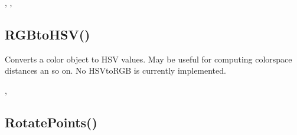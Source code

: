 \documentclass[letterpaper,10pt,english]{sphinxmanual}
\begin{document}
\sphinxAtStartPar
{}

\sphinxAtStartPar
{}, , 

\ignorespaces 

\subsection{RGBtoHSV()}
\label{\detokenize{reference/graphics:rgbtohsv}}\label{\detokenize{reference/graphics:index-16}}
\sphinxAtStartPar
{}

\sphinxAtStartPar
{}

\sphinxAtStartPar
Converts a color object to HSV values.  May be useful for computing color\sphinxhyphen{}space distances an so on.  No HSVtoRGB is currently implemented.

\sphinxAtStartPar
{}

\begin{sphinxVerbatim}[commandchars=\\\{\}]
\end{sphinxVerbatim}

\sphinxAtStartPar
{}

\begin{sphinxVerbatim}[commandchars=\\\{\}]
\PYGZdq{}
\end{sphinxVerbatim}

\sphinxAtStartPar
{}

\sphinxAtStartPar
{}, 

\ignorespaces 

\subsection{RotatePoints()}
\label{\detokenize{reference/graphics:rotatepoints}}\label{\detokenize{reference/graphics:index-17}}
\sphinxAtStartPar
{}
\end{document}
